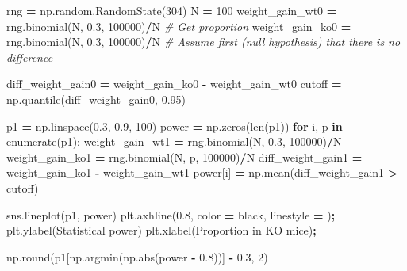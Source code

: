 \documentclass[
  letterpaper,
]{scrbook}
\newenvironment{Shaded}{\begin{snugshade}}{\end{snugshade}}
\newcommand{\BuiltInTok}[1]{#1}
\newcommand{\CommentTok}[1]{\textcolor[rgb]{0.56,0.35,0.01}{\textit{#1}}}
\newcommand{\ControlFlowTok}[1]{\textcolor[rgb]{0.13,0.29,0.53}{\textbf{#1}}}
\newcommand{\DecValTok}[1]{\textcolor[rgb]{0.00,0.00,0.81}{#1}}
\newcommand{\FloatTok}[1]{\textcolor[rgb]{0.00,0.00,0.81}{#1}}
\newcommand{\KeywordTok}[1]{\textcolor[rgb]{0.13,0.29,0.53}{\textbf{#1}}}
\newcommand{\NormalTok}[1]{#1}
\newcommand{\OperatorTok}[1]{\textcolor[rgb]{0.81,0.36,0.00}{\textbf{#1}}}
\newcommand{\StringTok}[1]{\textcolor[rgb]{0.31,0.60,0.02}{#1}}
\begin{document}
\begin{Shaded}
\begin{Highlighting}[]
\NormalTok{rng }\OperatorTok{=}\NormalTok{ np.random.RandomState(}\DecValTok{304}\NormalTok{)}
\NormalTok{N }\OperatorTok{=} \DecValTok{100}
\NormalTok{weight\_gain\_wt0 }\OperatorTok{=}\NormalTok{ rng.binomial(N, }\FloatTok{0.3}\NormalTok{, }\DecValTok{100000}\NormalTok{)}\OperatorTok{/}\NormalTok{N }\CommentTok{\# Get proportion}
\NormalTok{weight\_gain\_ko0 }\OperatorTok{=}\NormalTok{ rng.binomial(N, }\FloatTok{0.3}\NormalTok{, }\DecValTok{100000}\NormalTok{)}\OperatorTok{/}\NormalTok{N }\CommentTok{\# Assume first (null hypothesis) that there is no difference}

\NormalTok{diff\_weight\_gain0 }\OperatorTok{=}\NormalTok{ weight\_gain\_ko0 }\OperatorTok{{-}}\NormalTok{ weight\_gain\_wt0}
\NormalTok{cutoff }\OperatorTok{=}\NormalTok{ np.quantile(diff\_weight\_gain0, }\FloatTok{0.95}\NormalTok{)}

\NormalTok{p1 }\OperatorTok{=}\NormalTok{ np.linspace(}\FloatTok{0.3}\NormalTok{, }\FloatTok{0.9}\NormalTok{, }\DecValTok{100}\NormalTok{)}
\NormalTok{power }\OperatorTok{=}\NormalTok{ np.zeros(}\BuiltInTok{len}\NormalTok{(p1))}
\ControlFlowTok{for}\NormalTok{ i, p }\KeywordTok{in} \BuiltInTok{enumerate}\NormalTok{(p1):}
\NormalTok{    weight\_gain\_wt1 }\OperatorTok{=}\NormalTok{ rng.binomial(N, }\FloatTok{0.3}\NormalTok{, }\DecValTok{100000}\NormalTok{)}\OperatorTok{/}\NormalTok{N}
\NormalTok{    weight\_gain\_ko1 }\OperatorTok{=}\NormalTok{ rng.binomial(N, p, }\DecValTok{100000}\NormalTok{)}\OperatorTok{/}\NormalTok{N}
\NormalTok{    diff\_weight\_gain1 }\OperatorTok{=}\NormalTok{ weight\_gain\_ko1 }\OperatorTok{{-}}\NormalTok{ weight\_gain\_wt1}
\NormalTok{    power[i] }\OperatorTok{=}\NormalTok{ np.mean(diff\_weight\_gain1 }\OperatorTok{\textgreater{}}\NormalTok{ cutoff)}

\NormalTok{sns.lineplot(p1, power)}
\NormalTok{plt.axhline(}\FloatTok{0.8}\NormalTok{, color }\OperatorTok{=} \StringTok{\textquotesingle{}black\textquotesingle{}}\NormalTok{, linestyle }\OperatorTok{=} \StringTok{\textquotesingle{}{-}{-}\textquotesingle{}}\NormalTok{)}\OperatorTok{;}
\NormalTok{plt.ylabel(}\StringTok{\textquotesingle{}Statistical power\textquotesingle{}}\NormalTok{)}
\NormalTok{plt.xlabel(}\StringTok{\textquotesingle{}Proportion in KO mice\textquotesingle{}}\NormalTok{)}\OperatorTok{;}
\end{Highlighting}
\end{Shaded}

\begin{Shaded}
\begin{Highlighting}[]
\NormalTok{np.}\BuiltInTok{round}\NormalTok{(p1[np.argmin(np.}\BuiltInTok{abs}\NormalTok{(power }\OperatorTok{{-}} \FloatTok{0.8}\NormalTok{))] }\OperatorTok{{-}} \FloatTok{0.3}\NormalTok{, }\DecValTok{2}\NormalTok{)}
\end{Highlighting}
\end{Shaded}
\end{document}
